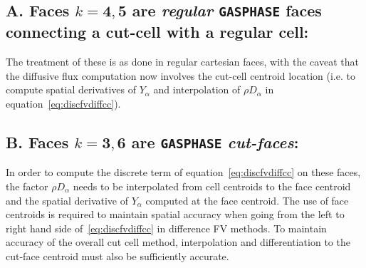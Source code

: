 \subsection*{A. Faces $k=\mathbf{4},\mathbf{5}$ are \textit{regular} \texttt{GASPHASE} faces connecting a cut-cell with a regular cell:}
The treatment of these is as done in regular cartesian faces, with the caveat that the diffusive flux computation now involves the cut-cell centroid location (i.e. to compute spatial derivatives of $Y_\alpha$ and interpolation of $\rho D_\alpha$ in equation~\eqref{eq:discfvdiffcc}).

\subsection*{B. Faces $k=\mathbf{3},\mathbf{6}$ are \texttt{GASPHASE} \textit{cut-faces}:}

In order to compute the discrete term of equation~\eqref{eq:discfvdiffcc} on these faces, the factor $\rho D_\alpha$ needs to be interpolated from cell centroids to the face centroid and the spatial derivative of $Y_\alpha$ computed at the face centroid. The use of face centroids is required to maintain spatial accuracy when going from the left to right hand side of~\eqref{eq:discfvdiffcc} in difference FV methods. To maintain accuracy of the overall cut cell method, interpolation and differentiation to the cut-face centroid must also be sufficiently accurate.

